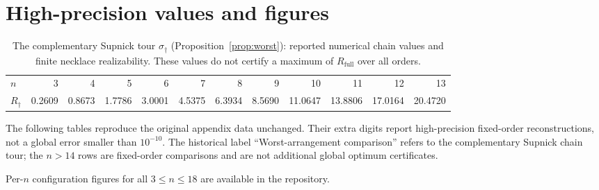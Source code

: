 \documentclass[11pt]{article}
\theoremstyle{definition}
\theoremstyle{remark}
\begin{document}
\appendix
\section{High-precision values and figures}
\begin{table}[ht]\centering
\caption{The complementary Supnick tour $\sigma_\dagger$ (Proposition~\ref{prop:worst}): reported numerical chain values and finite necklace realizability. These values do not certify a maximum of $R_{\mathrm{full}}$ over all orders.}
\label{tab:worst}
\small
\setlength{\tabcolsep}{4pt}
\begin{tabular}{lrrrrrrrrrrr}
\toprule
$n$ & 3 & 4 & 5 & 6 & 7 & 8 & 9 & 10 & 11 & 12 & 13 \\
$R_\dagger$ & 0.2609 & 0.8673 & 1.7786 & 3.0001 & 4.5375 & 6.3934 & 8.5690 & 11.0647 & 13.8806 & 17.0164 & 20.4720 \\
\bottomrule
\end{tabular}
\end{table}

The following tables reproduce the original appendix data unchanged. Their extra digits report high-precision fixed-order reconstructions, not a global error smaller than $10^{-10}$. The historical label ``Worst-arrangement comparison'' refers to the complementary Supnick chain tour; the $n>14$ rows are fixed-order comparisons and are not additional global optimum certificates.
\begingroup
\setlength{\tabcolsep}{2pt}

\endgroup

Per-$n$ configuration figures for all $3\le n\le 18$ are available in the repository.
\end{document}
